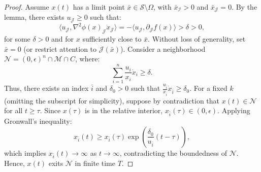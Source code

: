 \documentclass[11pt]{article}
\newcommand{\cI}{\mathcal I}
\newcommand{\cJ}{\mathcal J}
\newcommand{\cM}{\mathcal M}
\newcommand{\cN}{\mathcal N}
\def\inner#1{\left\langle#1\right\rangle}
\begin{document}
\begin{proof}



Assume $ x(t) $ has a limit point $ \bar{x} \in \mathcal{S} \setminus \Omega $, with $ \bar{x}_{\mathcal{I}} > 0 $ and $ \bar{x}_{\mathcal{J}} = 0 $. By the lemma, there exists $ u_{\mathcal{J}} \geq 0 $ such that:
$$\langle u_{\mathcal{J}}, \nabla^2 \phi(x)_{\mathcal{J}} \dot{x}_{\mathcal{J}} \rangle = -\langle u_{\mathcal{J}}, \partial_{\mathcal{J}} f(x) \rangle > \delta > 0,$$
for some $ \delta > 0 $ and for $ x $ sufficiently close to $ \bar{x} $. Without loss of generality, set $ \bar{x} = 0 $ (or restrict attention to $ \mathcal{J}(\bar{x}) $). Consider a neighborhood $ \mathcal{N} = (0, \epsilon)^n \cap \mathcal{M} \cap C $, where:
$$\sum_{i=1}^n \frac{u_i}{x_i} \dot{x}_i \geq \delta.$$
Thus, there exists an index $ \bar{i} $ and $ \delta_0 > 0 $ such that $ \frac{u_{\bar{i}}}{x_{\bar{i}}} \dot{x}_{\bar{i}} \geq \delta_0 $. For a fixed $ k $ (omitting the subscript for simplicity), suppose by contradiction that $ x(t) \in \mathcal{N} $ for all $ t \geq \tau $. Since $ x(\tau) $ is in the relative interior, $ x_{\bar{i}}(\tau) \in (0, \epsilon) $. Applying Gronwall’s inequality:
$$x_{\bar{i}}(t) \geq x_{\bar{i}}(\tau) \exp \left( \frac{\delta_0}{u_{\bar{i}}} (t - \tau) \right),$$
which implies $ x_{\bar{i}}(t) \to \infty $ as $ t \to \infty $, contradicting the boundedness of $ \mathcal{N} $. Hence, $ x(t) $ exits $ \mathcal{N} $ in finite time $ T $.
\end{proof}
\end{document}
